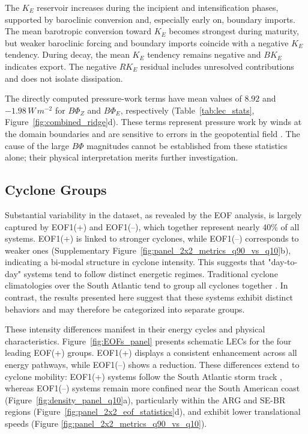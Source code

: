 \documentclass[pdflatex,sn-chicago]{sn-jnl}%
\theoremstyle{plain}
\theoremstyle{definition}
\theoremstyle{remark}
\theoremstyle{definition}
\begin{document}
The $K_E$ reservoir increases during the incipient and intensification phases, supported by baroclinic conversion and, especially early on, boundary imports. The mean barotropic conversion toward $K_E$ becomes strongest during maturity, but weaker baroclinic forcing and boundary imports coincide with a negative $K_E$ tendency. During decay, the mean $K_E$ tendency remains negative and $BK_E$ indicates export. The negative $RK_E$ residual includes unresolved contributions and does not isolate dissipation.

The directly computed pressure-work terms have mean values of $8.92$ and $-1.98\,W\,m^{-2}$ for $B\Phi_Z$ and $B\Phi_E$, respectively (Table~\ref{tab:lec_stats}, Figure~\ref{fig:combined_ridge}d). These terms represent pressure work by winds at the domain boundaries and are sensitive to errors in the geopotential field \citep{brennan1980zonal}. The cause of the large $B\Phi$ magnitudes cannot be established from these statistics alone; their physical interpretation merits further investigation.


\subsection{Cyclone Groups}

Substantial variability in the dataset, as revealed by the EOF analysis, is largely captured by EOF1(+) and EOF1(–), which together represent nearly 40\% of all systems. EOF1(+) is linked to stronger cyclones, while EOF1(–) corresponds to weaker ones (Supplementary Figure~\ref{fig:panel_2x2_metrics_q90_vs_q10}b), indicating a bi-modal structure in cyclone intensity. This suggests that "day-to-day" systems tend to follow distinct energetic regimes. Traditional cyclone climatologies over the South Atlantic tend to group all cyclones together \citep[e.g.,]{sinclair1994objective,hoskins2005new,reboita2010south,gramcianinov2019properties}. In contrast, the results presented here suggest that these systems exhibit distinct behaviors and may therefore be categorized into separate groups.


These intensity differences manifest in their energy cycles and physical characteristics. Figure~\ref{fig:EOFs_panel} presents schematic LECs for the four leading EOF(+) groups. EOF1(+) displays a consistent enhancement across all energy pathways, while EOF1(–) shows a reduction. These differences extend to cyclone mobility: EOF1(+) systems follow the South Atlantic storm track \citep{hoskins2005new,gramcianinov2019properties}, whereas EOF1(–) systems remain more confined near the South American coast (Figure~\ref{fig:density_panel_q10}a), particularly within the ARG and SE-BR regions (Figure~\ref{fig:panel_2x2_eof_statistics}d), and exhibit lower translational speeds (Figure \ref{fig:panel_2x2_metrics_q90_vs_q10}).
\end{document}
